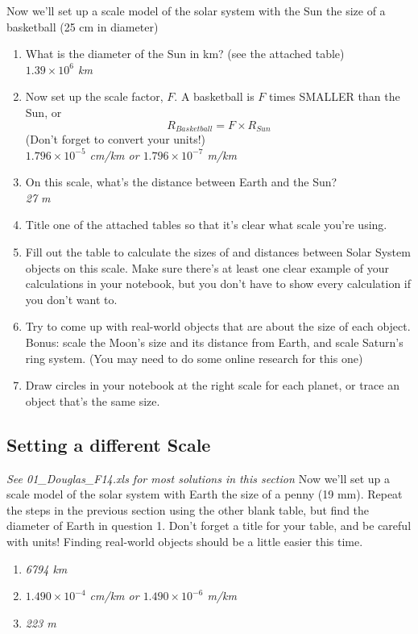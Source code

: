 \documentclass[12pt]{article}%
\begin{document}
\begin{flushleft}
Now we'll set up a scale model of the solar system with the Sun the size of a basketball (25 cm in diameter)

\begin{enumerate}
\item What is the diameter of the Sun in km? (see the attached table) \\ {\it $1.39 \times 10^6$ km}
\item Now set up the scale factor, $F$.  A basketball is $F$ times SMALLER than the Sun, or $$R_{Basketball} = F \times R_{Sun}$$  (Don't forget to convert your units!) \\ {\it $1.796 \times 10^{-5}$ cm/km or $1.796 \times 10^{-7}$ m/km }
\item On this scale, what's the distance between Earth and the Sun? \\{\it 27 m}
\item Title one of the attached tables so that it's clear what scale you're using.
\item Fill out the table to calculate the sizes of and distances between Solar System objects on this scale. Make sure there's at least one clear example of your calculations in your notebook, but you don't have to show every calculation if you don't want to. 
\item Try to come up with real-world objects that are about the size of each object. \\
\indent Bonus: scale the Moon's size and its distance from Earth, and scale Saturn's ring system. (You may need to do some online research for this one)
\item Draw circles in your notebook at the right scale for each planet, or trace an object that's the same size.
\end{enumerate}

\subsection{Setting a different Scale}
{ \it {\large See 01\_Douglas\_F14.xls for most solutions in this section }}
Now we'll set up a scale model of the solar system with Earth the size of a penny (19 mm).  Repeat the steps in the previous section using the other blank table, but find the diameter of Earth in question 1.  Don't forget a title for your table, and be careful with units! Finding real-world objects should be a little easier this time.
\begin{enumerate}
\item {\it 6794 km}
\item {\it $1.490 \times 10^{-4}$ cm/km or $1.490 \times 10^{-6}$ m/km }
\item {\it 223 m}
\end{enumerate}


\end{flushleft}
\end{document}
